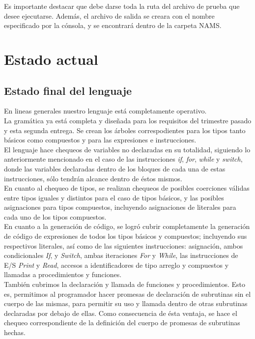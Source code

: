 \documentclass[11pt, spanish]{report}
\begin{document}
Es importante destacar que debe darse toda la ruta del archivo de prueba que desee ejecutarse. Adem\'as, el archivo
de salida se creara con el nombre especificado por la c\'onsola, y se encontrar\'a dentro de la carpeta NAMS.\\

\chapter{Estado actual}
\section{Estado final del lenguaje}
En lineas generales nuestro lenguaje est\'a completamente operativo.\\

La gram\'atica ya est\'a completa y dise\~nada para los requisitos del trimestre pasado y esta segunda entrega. Se crean los \'arboles correspodientes para los tipos tanto b\'asicos
como compuestos y para las expresiones e instrucciones.\\

El lenguaje hace chequeos de variables no declaradas en su totalidad, siguiendo lo anteriormente mencionado en el caso de las instrucciones \emph{if},
\emph{for}, \emph{while} y \emph{switch}, donde las variables declaradas dentro de los bloques de cada una de estas instrucciones, s\'olo tendr\'an 
alcance dentro de \'estos mismos.\\

En cuanto al chequeo de tipos, se realizan chequeos de posibles coerciones v\'alidas entre tipos iguales y distintos para el caso de tipos b\'asicos, y las posibles
asignaciones para tipos compuestos, incluyendo asignaciones de literales para cada uno de los tipos compuestos.\\

En cuanto a la generaci\'on de c\'odigo, se logr\'o cubrir completamente la generaci\'on de c\'odigo de expresiones de todos los tipos b\'asicos y compuestos; incluyendo sus 
respectivos literales, as\'i como de las siguientes instrucciones: asignaci\'on, ambos condicionales \emph{If}, y \emph{Switch}, ambas iteraciones \emph{For} y \emph{While}, 
las instrucciones de E/S \emph{Print} y \emph{Read}, accesos a identificadores de tipo arreglo y compuestos y llamadas a procedimientos y funciones.\\

Tambi\'en cubrimos la declaraci\'on y llamada de funciones y procedimientos. Esto es, permitimos al programador hacer promesas de declaraci\'on
de subrutinas sin el cuerpo de las mismas, para permitir su uso y llamada dentro de otras subrutinas declaradas por debajo de ellas. Como consecuencia de \'esta
ventaja, se hace el chequeo correspondiente de la definici\'on del cuerpo de promesas de subrutinas hechas.\\
\end{document}
